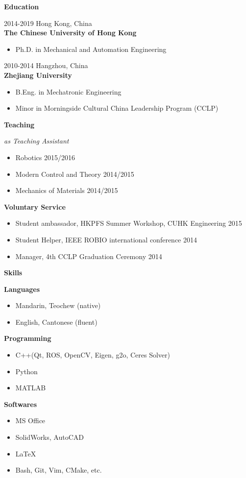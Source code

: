 \documentclass[11pt]{article}
\newcommand{\subsec}[1]{
  \vskip 4pt
  {\bf\large\color{teal}  #1}
  \vskip 1pt
}
\newcommand{\yearspaceevent}[3]{
  {\color{gray} \small #1 \hfill #2}\\
  {\bf #3}
}
\newcommand{\yearat}[1]{
  {\hfill \color{gray} #1}
}
\begin{document}
\hfill\begingroup\color{teal}\vrule width 1pt\endgroup\hfill
\noindent
\begin{minipage}[t]{0.34\textwidth}
  \subsec{Education}
  \yearspaceevent{2014-2019}{Hong Kong, China}{The Chinese University of Hong Kong}
  \begin{itemize}
    \item Ph.D. in Mechanical and Automation Engineering
  \end{itemize}

  \yearspaceevent{2010-2014}{Hangzhou, China}{Zhejiang University}
  \begin{itemize}
    \item B.Eng. in Mechatronic Engineering
    \item {Minor} in Morningside Cultural China Leadership Program (CCLP)
  \end{itemize}

  \subsec{Teaching}
  \emph{as Teaching Assistant}
  \begin{itemize}
    \item Robotics \yearat{2015/2016}
    \item Modern Control and Theory \yearat{2014/2015}
    \item Mechanics of Materials \yearat{2014/2015}
  \end{itemize}

  \subsec{Voluntary Service}
  \begin{itemize}
    \item Student ambassador,  HKPFS Summer Workshop, CUHK Engineering \yearat{2015}
    \item Student Helper, IEEE ROBIO international conference \yearat{2014}
    \item Manager, 4th CCLP Graduation Ceremony \yearat{2014}
  \end{itemize}

  \subsec{Skills}
  {\bf Languages}
  \begin{itemize}
    \item Mandarin, Teochew (native)
    \item English, Cantonese (fluent)
  \end{itemize}
  {\bf Programming}
  \begin{itemize}
    \item C++(Qt, ROS, OpenCV, Eigen, g2o, Ceres Solver)
    \item Python
    \item MATLAB
  \end{itemize}
  {\bf Softwares}
  \begin{itemize}
    \item MS Office
    \item SolidWorks, AutoCAD
    \item \LaTeX
    \item Bash, Git, Vim, CMake, etc.
  \end{itemize}


\end{minipage}
\end{document}
